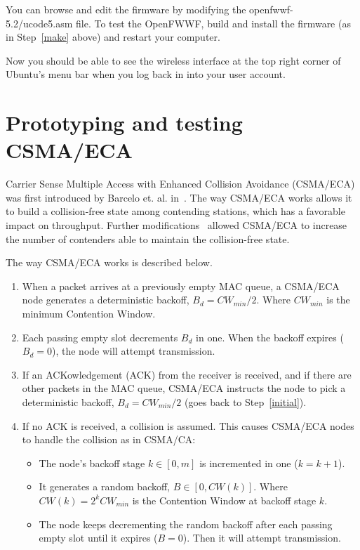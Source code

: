 \documentclass[conference]{IEEEtran}
\begin{document}
You can browse and edit the firmware by modifying the openfwwf-5.2/ucode5.asm file. To test the OpenFWWF, build and install the firmware (as in Step~\ref{make} above) and restart your computer.

Now you should be able to see the wireless interface at the top right corner of Ubuntu's menu bar when you log back in into your user account.

\section{Prototyping and testing CSMA/ECA}\label{explanation}
Carrier Sense Multiple Access with Enhanced Collision Avoidance (CSMA/ECA) was first introduced by Barcelo et. al. in~\cite{barcelo2008lba}. The way CSMA/ECA works allows it to build a collision-free state among contending stations, which has a favorable impact on throughput. Further modifications~\cite{research2standards} allowed CSMA/ECA to increase the number of contenders able to maintain the collision-free state.

The way CSMA/ECA works is described below.

\begin{enumerate}
	\item When a packet arrives at a previously empty MAC queue, a CSMA/ECA node generates a deterministic backoff, $B_{d}=CW_{min}/2$. Where $CW_{min}$ is the minimum Contention Window.\label{initial}
 	\item Each passing empty slot decrements $B_{d}$ in one. When the backoff expires ($B_{d}=0$), the node will attempt transmission.
 	\item If an ACKowledgement (ACK) from the receiver is received, and if there are other packets in the MAC queue, CSMA/ECA instructs the node to pick a deterministic backoff, $B_{d}=CW_{min}/2$ (goes back to Step~\ref{initial}).
 	\item If no ACK is received, a collision is assumed.  This causes CSMA/ECA nodes to handle the collision as in CSMA/CA:
		\begin{itemize}
			\item The node's backoff stage $k\in[0,m]$ is incremented in one ($k=k+1$).
			\item It generates a random backoff, $B\in[0,CW(k)]$. Where $CW(k)=2^{k}CW_{min}$ is the Contention Window at backoff stage $k$.
			\item The node keeps decrementing the random backoff after each passing empty slot until it expires ($B=0$). Then it will attempt transmission.
		\end{itemize}
\end{enumerate}
\end{document}
